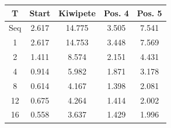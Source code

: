 \begin{tabular}{|c|c|c|c|c|}
\hline
T & Start & Kiwipete & Pos. 4 & Pos. 5 \\
\hline
Seq & 2.617 & 14.775 & 3.505 & 7.541 \\
\hline
1 & 2.617 & 14.753 & 3.448 & 7.569 \\
2 & 1.411 & 8.574 & 2.151 & 4.431 \\
4 & 0.914 & 5.982 & 1.871 & 3.178 \\
8 & 0.614 & 4.167 & 1.398 & 2.081 \\
12 & 0.675 & 4.264 & 1.414 & 2.002 \\
16 & 0.558 & 3.637 & 1.429 & 1.996 \\
\hline
\end{tabular}
